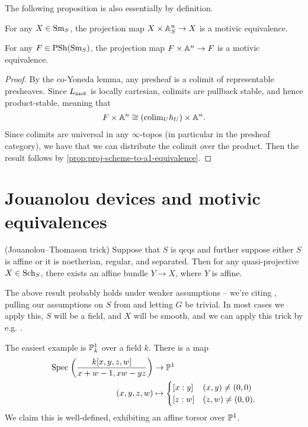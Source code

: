 \documentclass[11pt]{amsart}
\renewcommand{\Pre}{\mathrm{PSh}}
\begin{document}
The following proposition is also essentially by definition.

\begin{proposition}\label{prop:proj-scheme-to-a1-equivalence} 
For any $X\in \Sm_S$, the projection map $X \times \A^n_S \to X$ is a motivic equivalence.
\end{proposition}

\begin{proposition} For any $F\in \Pre(\Sm_S)$, the projection map $F \times \A^n \to F$ is a motivic equivalence.
\end{proposition}
\begin{proof} By the co-Yoneda lemma, any presheaf is a colimit of representable presheaves. Since $L_\mot$ is locally cartesian, colimits are pullback stable, and hence product-stable, meaning that
\begin{align*}
    F \times \A^n \cong \left(\colim_U h_U\right) \times \A^n.
\end{align*}
Since colimits are universal in any $\infty$-topos (in particular in the presheaf category), we have that we can distribute the colimit over the product. Then the result follows by \autoref{prop:proj-scheme-to-a1-equivalence}.
\end{proof}


\section{Jouanolou devices and motivic equivalences}


\begin{theorem} (Jouanolou--Thomason trick) Suppose that $S$ is qcqs and further suppose either $S$ is affine or it is noetherian, regular, and separated. Then for any quasi-projective $X\in \Sch_S$, there exists an affine bundle $Y \to X$, where $Y$ is affine.
\end{theorem}

\begin{remark} The above result probably holds under weaker assumptions -- we're citing \cite[2.20]{Hoyois6}, pulling our assumptions on $S$ from \cite[2.8]{Hoyois6} and letting $G$ be trivial. In most cases we apply this, $S$ will be a field, and $X$ will be smooth, and we can apply this trick by e.g. \cite[3.3.3]{AF-spheres}.
\end{remark}


\begin{example} The easiest example is $\P^1_k$ over a field $k$. There is a map
\begin{align*}
    \Spec \left( \frac{k[x,y,z,w]}{x+w-1,xw-yz} \right) &\to \P^1 \\
    (x,y,z,w) &\mapsto \begin{cases} [x:y] & (x,y)\ne (0,0) \\ [z:w] & (z,w)\ne (0,0). \end{cases}
\end{align*}
We claim this is well-defined, exhibiting an affine torsor over $\P^1$.
\end{example}
\end{document}
